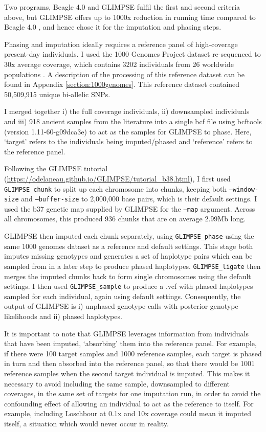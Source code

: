{Two programs, Beagle 4.0 \cite{Browning2007} and GLIMPSE \cite{rubinacci2021efficient} fulfil the first and second criteria above, but GLIMPSE offers up to 1000x reduction in running time compared to Beagle 4.0 \cite{rubinacci2021efficient}, and hence chose it for the imputation and phasing steps.   

Phasing and imputation ideally requires a reference panel of high-coverage present-day individuals. I used the 1000 Genomes Project dataset re-sequenced to 30x average coverage, which contains 3202 individuals from 26 worldwide populations \cite{byrska2021high}. A description of the processing of this reference dataset can be found in Appendix \ref{section:1000genomes}. This reference dataset contained 50,509,915 unique bi-allelic SNPs. 

I merged together i) the full coverage individuals, ii) downsampled individuals and iii) 918 ancient samples from the literature into a single bcf file using bcftools (version 1.11-60-g09dca3e) \cite{li2011statistical} to act as the samples for GLIMPSE to phase. Here, `target' refers to the individuals being imputed/phased and `reference' refers to the reference panel.  

Following the GLIMPSE tutorial (\url{https://odelaneau.github.io/GLIMPSE/tutorial_b38.html}), I first used \texttt{GLIMPSE\_chunk} to split up each  chromosome into chunks, keeping both \texttt{--window-size} and \texttt{--buffer-size} to 2,000,000 base pairs, which is their default settings. I used the b37 genetic map supplied by GLIMPSE for the \texttt{--map} argument. Across all chromosomes, this produced 936 chunks that are on average 2.99Mb long. 

GLIMPSE then imputed each chunk separately, using \texttt{GLIMPSE\_phase} using the same 1000 genomes dataset as a reference and default settings. This stage both imputes missing genotypes and generates a set of haplotype pairs which can be sampled from in a later step to produce phased haplotypes. \texttt{GLIMPSE\_ligate} then merges the imputed chunks back to form single chromosomes using the default settings. I then used \texttt{GLIMPSE\_sample} to produce a .vcf with phased haplotypes sampled for each individual, again using default settings. Consequently, the output of GLIMPSE is i) unphased genotype calls with posterior genotype likelihoods and ii) phased haplotypes.

It is important to note that GLIMPSE leverages information from individuals that have been imputed, `absorbing' them into the reference panel. For example, if there were 100 target samples and 1000 reference samples, each target is phased in turn and then absorbed into the reference panel, so that there would be 1001 reference samples when the second target individual is imputed. This makes it necessary to avoid including the same sample, downsampled to different coverages, in the same set of targets for one imputation run, in order to avoid the confounding effect of allowing an individual to act as the reference to itself. For example, including Loschbour at 0.1x and 10x coverage could mean it imputed itself, a situation which would never occur in reality. 


}
